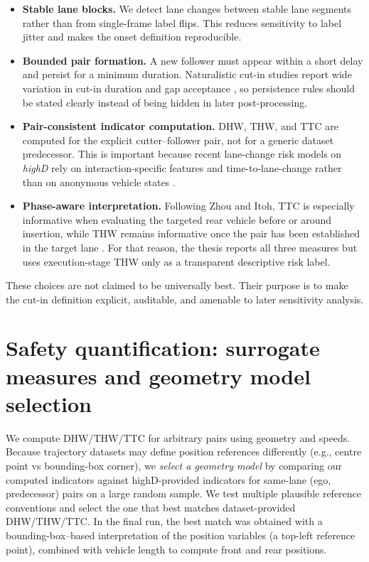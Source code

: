 \documentclass[12pt,a4paper,twoside,openright]{report}
\begin{document}
    \begin{itemize}[leftmargin=1.2em]
  \item \textbf{Stable lane blocks.} We detect lane changes between stable lane segments rather than from single-frame label flips. This reduces sensitivity to label jitter and makes the onset definition reproducible.
  \item \textbf{Bounded pair formation.} A new follower must appear within a short delay and persist for a minimum duration. Naturalistic cut-in studies report wide variation in cut-in duration and gap acceptance \cite{wang2019cutin}, so persistence rules should be stated clearly instead of being hidden in later post-processing.
  \item \textbf{Pair-consistent indicator computation.} DHW, THW, and TTC are computed for the explicit cutter--follower pair, not for a generic dataset predecessor. This is important because recent lane-change risk models on \textit{highD} rely on interaction-specific features and time-to-lane-change rather than on anonymous vehicle states \cite{shangguan2022,liu2025multitask}.
  \item \textbf{Phase-aware interpretation.} Following Zhou and Itoh, TTC is especially informative when evaluating the targeted rear vehicle before or around insertion, while THW remains informative once the pair has been established in the target lane \cite{zhou2016riskperception}. For that reason, the thesis reports all three measures but uses execution-stage THW only as a transparent descriptive risk label.
    \end{itemize}

    These choices are not claimed to be universally best. Their purpose is to make the cut-in definition explicit, auditable, and amenable to later sensitivity analysis.

    \section{Safety quantification: surrogate measures and geometry model selection}
    We compute DHW/THW/TTC for arbitrary pairs using geometry and speeds. Because trajectory datasets may define position references differently (e.g., centre point vs bounding-box corner), we \emph{select a geometry model} by comparing our computed indicators against highD-provided indicators for same-lane (ego, predecessor) pairs on a large random sample. We test multiple plausible reference conventions and select the one that best matches dataset-provided DHW/THW/TTC. In the final run, the best match was obtained with a bounding-box--based interpretation of the position variables (a top-left reference point), combined with vehicle length to compute front and rear positions.
\end{document}
